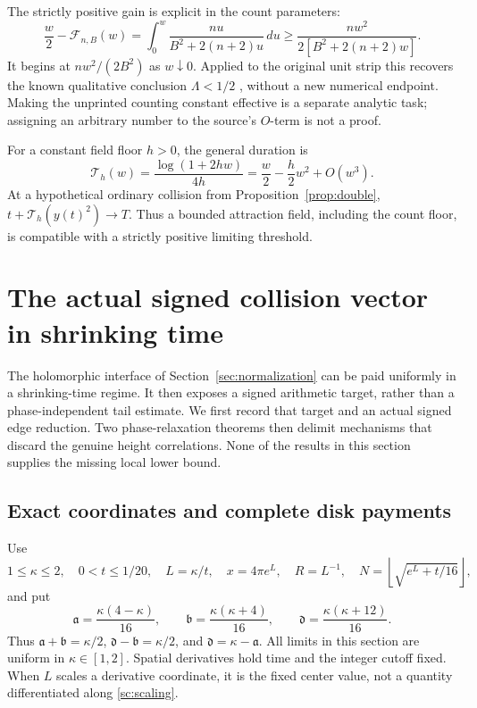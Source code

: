 \documentclass[11pt]{article}
\numberwithin{equation}{section}
\theoremstyle{definition}
\theoremstyle{remark}
\newcommand{\dd}{\,d}
\begin{document}
The strictly positive gain is explicit in the count parameters:
\begin{equation}\label{eq:landinggain}
 \frac w2-\mathcal F_{n,B}(w)
 =\int_0^w\frac{nu}{B^2+2(n+2)u}\dd u
 \ge\frac{nw^2}{2[B^2+2(n+2)w]}.
\end{equation}
It begins at $nw^2/(2B^2)$ as $w\downarrow0$. Applied to the
original unit strip this recovers the known qualitative conclusion
$\Lambda<1/2$ \cite{kikimlee}, without a new numerical endpoint. Making the
unprinted counting constant effective is a separate analytic task;
assigning an arbitrary number to the source's $O$-term is not a proof.

For a constant field floor $h>0$, the general duration is
\begin{equation}\label{eq:constantlanding}
 \mathcal T_h(w)=\frac{\log(1+2hw)}{4h}
 =\frac w2-\frac h2w^2+O(w^3).
\end{equation}
At a hypothetical ordinary collision from
Proposition~\ref{prop:double}, $t+\mathcal T_h(y(t)^2)\to T$.
Thus a bounded attraction field, including the count floor, is
compatible with a strictly positive limiting threshold.


\section{The actual signed collision vector in shrinking time}
\label{sc:section}
The holomorphic interface of Section~\ref{sec:normalization} can be paid
uniformly in a shrinking-time regime. It then exposes a signed arithmetic
target, rather than a phase-independent tail estimate. We first record that
target and an actual signed edge reduction. Two phase-relaxation theorems
then delimit mechanisms that discard the genuine height correlations.
None of the results in this section supplies the missing local lower bound.

\subsection{Exact coordinates and complete disk payments}
Use
\begin{equation}\label{sc:scaling}
 1\le\kappa\le2,\quad 0<t\le1/20,\quad L=\kappa/t,\quad
 x=4\pi e^L,\quad R=L^{-1},\quad
 N=\left\lfloor\sqrt{e^L+t/16}\right\rfloor,
\end{equation}
and put
\begin{equation}\label{sc:exponents}
 \mathfrak a=\frac{\kappa(4-\kappa)}{16},\qquad
 \mathfrak b=\frac{\kappa(\kappa+4)}{16},\qquad
 \mathfrak d=\frac{\kappa(\kappa+12)}{16}.
\end{equation}
Thus $\mathfrak a+\mathfrak b=\kappa/2$,
$\mathfrak d-\mathfrak b=\kappa/2$, and
$\mathfrak d=\kappa-\mathfrak a$. All limits in this section are uniform
in $\kappa\in[1,2]$. Spatial derivatives hold time and the integer cutoff
fixed. When $L$ scales a derivative coordinate, it is the fixed center
value, not a quantity differentiated along \eqref{sc:scaling}.
\end{document}
